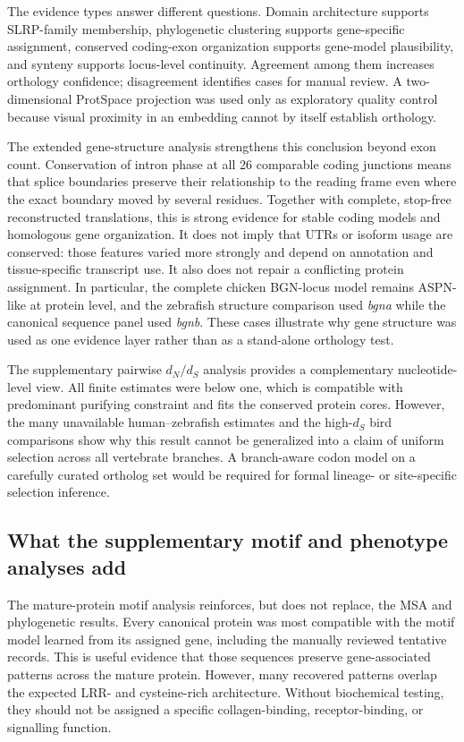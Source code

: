 The evidence types answer different questions. Domain architecture supports
SLRP-family membership, phylogenetic clustering supports gene-specific
assignment, conserved coding-exon organization supports gene-model plausibility,
and synteny supports locus-level continuity. Agreement among them increases
orthology confidence; disagreement identifies cases for manual review. A
two-dimensional ProtSpace projection was used only as exploratory quality
control because visual proximity in an embedding cannot by itself establish
orthology.

The extended gene-structure analysis strengthens this conclusion beyond exon
count. Conservation of intron phase at all 26 comparable coding junctions means
that splice boundaries preserve their relationship to the reading frame even
where the exact boundary moved by several residues. Together with complete,
stop-free reconstructed translations, this is strong evidence for stable coding
models and homologous gene organization. It does not imply that UTRs or isoform
usage are conserved: those features varied more strongly and depend on
annotation and tissue-specific transcript use.
It also does not repair a conflicting protein assignment. In particular, the
complete chicken BGN-locus model remains ASPN-like at protein level, and the
zebrafish structure comparison used \textit{bgna} while the canonical sequence
panel used \textit{bgnb}. These cases illustrate why gene structure was used as
one evidence layer rather than as a stand-alone orthology test.

The supplementary pairwise $d_N/d_S$ analysis provides a complementary
nucleotide-level view. All finite estimates were below one, which is compatible
with predominant purifying constraint and fits the conserved protein cores.
However, the many unavailable human--zebrafish estimates and the high-$d_S$
bird comparisons show why this result cannot be generalized into a claim of
uniform selection across all vertebrate branches. A branch-aware codon model on
a carefully curated ortholog set would be required for formal lineage- or
site-specific selection inference.

\subsection{What the supplementary motif and phenotype analyses add}
\label{subsec:discussion-supplementary-evidence}

The mature-protein motif analysis reinforces, but does not replace, the MSA and
phylogenetic results. Every canonical protein was most compatible with the motif
model learned from its assigned gene, including the manually reviewed tentative
records. This is useful evidence that those sequences preserve gene-associated
patterns across the mature protein. However, many recovered patterns overlap
the expected LRR- and cysteine-rich architecture. Without biochemical testing,
they should not be assigned a specific collagen-binding, receptor-binding, or
signalling function.


